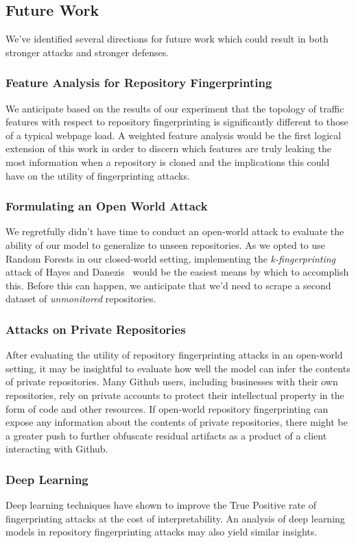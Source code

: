 \documentclass[sigconf,authorversion,nonacm]{acmart}
\begin{document}
\subsection{Future Work}
We've identified several directions for future work which could result in both stronger attacks and stronger defenses.


\subsubsection*{Feature Analysis for Repository Fingerprinting}
We anticipate based on the results of our experiment that the topology of traffic features with respect to repository fingerprinting is significantly different to those of a typical webpage load. A weighted feature analysis would be the first logical extension of this work in order to discern which features are truly leaking the most information when a repository is cloned and the implications this could have on the utility of fingerprinting attacks.

\subsubsection*{Formulating an Open World Attack}
We regretfully didn't have time to conduct an open-world attack to evaluate the ability of our model to generalize to unseen repositories. As we opted to use Random Forests in our closed-world setting, implementing the \textit{k-fingerprinting} attack of Hayes and Danezis~\citep{hayes2016k} would be the easiest means by which to accomplish this. Before this can happen, we anticipate that we'd need to scrape a second dataset of \textit{unmonitored} repositories.

\subsubsection*{Attacks on Private Repositories}
After evaluating the utility of repository fingerprinting attacks in an open-world setting, it may be insightful to evaluate how well the model can infer the contents of private repositories. Many Github users, including businesses with their own repositories, rely on private accounts to protect their intellectual property in the form of code and other resources. If open-world repository fingerprinting can expose any information about the contents of private repositories, there might be a greater push to further obfuscate residual artifacts as a product of a client interacting with Github.

\subsubsection*{Deep Learning}
Deep learning techniques have shown to improve the True Positive rate of fingerprinting attacks at the cost of interpretability. An analysis of deep learning models in repository fingerprinting attacks may also yield similar insights.





\end{document}
